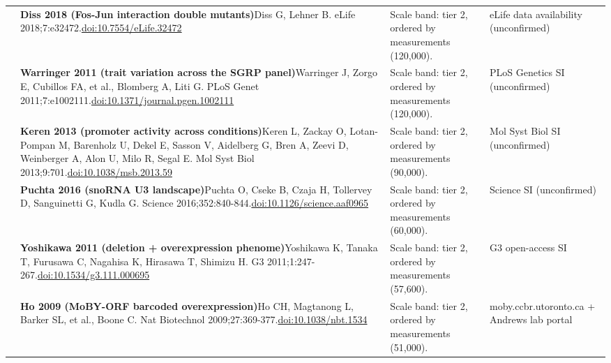 \begin{landscape}
\begin{longtable}{@{}r@{\hspace{4pt}} L{86mm} L{92mm} L{62mm}@{}}
 & \textbf{Diss 2018 (Fos-Jun interaction double mutants)}\newline Diss G, Lehner B. eLife 2018;7:e32472.\newline \href{https://doi.org/10.7554/eLife.32472}{doi:10.7554/\allowbreak eLife.32472} & Scale band: tier 2, ordered by measurements (120,000). & eLife data availability (unconfirmed) \\
 & \textbf{Warringer 2011 (trait variation across the SGRP panel)}\newline Warringer J, Zorgo E, Cubillos FA, et al., Blomberg A, Liti G. PLoS Genet 2011;7:e1002111.\newline \href{https://doi.org/10.1371/journal.pgen.1002111}{doi:10.1371/\allowbreak journal.pgen.1002111} & Scale band: tier 2, ordered by measurements (120,000). & PLoS Genetics SI (unconfirmed) \\
 & \textbf{Keren 2013 (promoter activity across conditions)}\newline Keren L, Zackay O, Lotan-Pompan M, Barenholz U, Dekel E, Sasson V, Aidelberg G, Bren A, Zeevi D, Weinberger A, Alon U, Milo R, Segal E. Mol Syst Biol 2013;9:701.\newline \href{https://doi.org/10.1038/msb.2013.59}{doi:10.1038/\allowbreak msb.2013.59} & Scale band: tier 2, ordered by measurements (90,000). & Mol Syst Biol SI (unconfirmed) \\
 & \textbf{Puchta 2016 (snoRNA U3 landscape)}\newline Puchta O, Cseke B, Czaja H, Tollervey D, Sanguinetti G, Kudla G. Science 2016;352:840-844.\newline \href{https://doi.org/10.1126/science.aaf0965}{doi:10.1126/\allowbreak science.aaf0965} & Scale band: tier 2, ordered by measurements (60,000). & Science SI (unconfirmed) \\
 & \textbf{Yoshikawa 2011 (deletion + overexpression phenome)}\newline Yoshikawa K, Tanaka T, Furusawa C, Nagahisa K, Hirasawa T, Shimizu H. G3 2011;1:247-267.\newline \href{https://doi.org/10.1534/g3.111.000695}{doi:10.1534/\allowbreak g3.111.000695} & Scale band: tier 2, ordered by measurements (57,600). & G3 open-access SI \\
 & \textbf{Ho 2009 (MoBY-ORF barcoded overexpression)}\newline Ho CH, Magtanong L, Barker SL, et al., Boone C. Nat Biotechnol 2009;27:369-377.\newline \href{https://doi.org/10.1038/nbt.1534}{doi:10.1038/\allowbreak nbt.1534} & Scale band: tier 2, ordered by measurements (51,000). & moby.ccbr.utoronto.ca + Andrews lab portal \\

\end{longtable}
\end{landscape}
